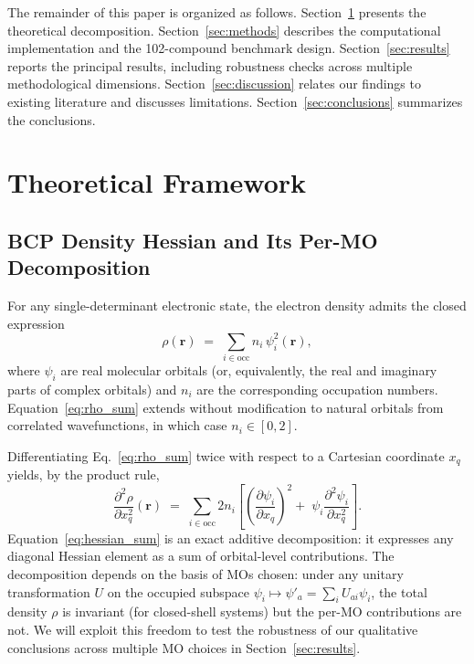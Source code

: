 \documentclass[11pt,a4paper]{article}
\begin{document}
The remainder of this paper is organized as follows.
Section~\ref{sec:theory} presents the theoretical decomposition.
Section~\ref{sec:methods} describes the computational implementation
and the 102-compound benchmark design.
Section~\ref{sec:results} reports the principal results, including
robustness checks across multiple methodological dimensions.
Section~\ref{sec:discussion} relates our findings to existing
literature and discusses limitations.
Section~\ref{sec:conclusions} summarizes the conclusions.

\section{Theoretical Framework}
\label{sec:theory}

\subsection{BCP Density Hessian and Its Per-MO Decomposition}

For any single-determinant electronic state, the electron density
admits the closed expression
\begin{equation}
\rho(\mathbf{r}) \;=\; \sum_{i \in \text{occ}} n_i\, \psi_i^2(\mathbf{r}),
\label{eq:rho_sum}
\end{equation}
where $\psi_i$ are real molecular orbitals (or, equivalently, the
real and imaginary parts of complex orbitals) and $n_i$ are the
corresponding occupation numbers. Equation~\ref{eq:rho_sum} extends
without modification to natural orbitals from
correlated wavefunctions, in which case $n_i \in [0,2]$.

Differentiating Eq.~\ref{eq:rho_sum} twice with respect to a Cartesian
coordinate $x_q$ yields, by the product rule,
\begin{equation}
\frac{\partial^2 \rho}{\partial x_q^2}(\mathbf{r})
\;=\;
\sum_{i \in \text{occ}} 2 n_i \!\left[
   \left(\frac{\partial \psi_i}{\partial x_q}\right)^{\!2}
   \!\!\!+\;
   \psi_i \frac{\partial^2 \psi_i}{\partial x_q^2}
\right].
\label{eq:hessian_sum}
\end{equation}
Equation~\ref{eq:hessian_sum} is an exact additive decomposition: it
expresses any diagonal Hessian element as a sum of orbital-level
contributions. The decomposition depends on the basis of MOs chosen:
under any unitary transformation $U$ on the occupied subspace
$\psi_i \mapsto \psi'_a = \sum_i U_{ai} \psi_i$, the total density
$\rho$ is invariant (for closed-shell systems) but the per-MO
contributions are not. We will exploit this freedom to test the
robustness of our qualitative conclusions across multiple MO choices
in Section~\ref{sec:results}.
\end{document}
